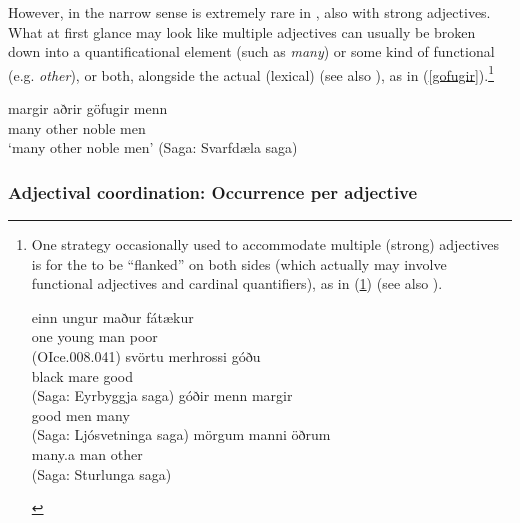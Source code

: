 \documentclass[output=paper,colorlinks,citecolor=brown]{langscibook}
\begin{document}
However,  in the narrow sense is extremely rare in , also with strong adjectives. What at first glance may look like multiple adjectives can usually be broken down into a quantificational element (such as \textit{many}) or some kind of functional  (e.g. \textit{other}), or both, alongside the actual (lexical)  (see also \cite{Bech17}), as in (\ref{gofugir}).\footnote{One strategy occasionally used to accommodate multiple (strong) adjectives is for the  to be ``flanked'' on both sides (which actually may involve functional adjectives and cardinal quantifiers), as in (\ref{flanked}) (see also ). 
\begin{multicols}{2}{
\begin{exe} 
\ex \label{flanked}   
    \begin{xlist}
         \ex\gll  einn ungur maður fátækur  \\ 
          one young man poor  \\ 
          \glt (OIce.008.041)
          \ex\gll  svörtu  merhrossi góðu  \\ 
            black mare good\\ 
            \glt (Saga: Eyrbyggja saga) 
          \ex\gll góðir  menn margir  \\ 
             good men many   \\
             \glt (Saga: Ljósvetninga  saga) 
         \ex \gll mörgum  manni öðrum  \\ 
          many.a man other \\ 
          \glt (Saga: Sturlunga saga)
\end{xlist} 
\end{exe}  }
\end{multicols}}


\begin{exe} 
   \ex \label{gofugir}
   \gll margir aðrir göfugir   menn  \\ 
     many other noble men \\
   \glt `many other noble men' (Saga: Svarfdæla saga)
\end{exe} 

\subsubsection{Adjectival coordination: Occurrence per adjective}
\end{document}

